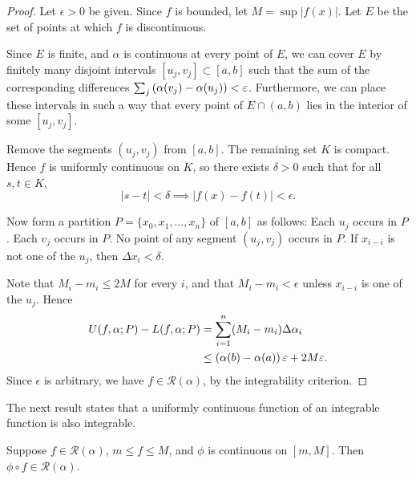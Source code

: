 \begin{proof}
Let $\epsilon>0$ be given. Since $f$ is bounded, let $M=\sup|f(x)|$. Let $E$ be the set of points at which $f$ is discontinuous.

Since $E$ is finite, and $\alpha$ is continuous at every point of $E$, we can cover $E$ by finitely many disjoint intervals $[u_j,v_j]\subset[a,b]$ such that the sum of the corresponding differences $\sum_{j}\left(\alpha(v_j)-\alpha(u_j)\right)<\varepsilon$. Furthermore, we can place these intervals in such a way that every point of $E\cap(a,b)$ lies in the interior of some $[u_j,v_j]$.

Remove the segments $(u_j,v_j)$ from $[a,b]$. The remaining set $K$ is compact. Hence $f$ is uniformly continuous on $K$, so there exists $\delta>0$ such that for all $s,t\in K$,
\[|s-t|<\delta\implies|f(x)-f(t)|<\epsilon.\]

Now form a partition $P=\{x_0,x_1,\dots,x_n\}$ of $[a,b]$ as follows: Each $u_j$ occurs in $P$. Each $v_j$ occurs in $P$. No point of any segment $(u_j,v_j)$ occurs in $P$. If $x_{i-i}$ is not one of the $u_j$, then $\Delta x_i<\delta$.

Note that $M_i-m_i\le 2M$ for every $i$, and that $M_i-m_i<\epsilon$ unless $x_{i-i}$ is one of the $u_j$. Hence
\begin{align*}
U(f,\alpha;P)-L(f,\alpha;P)
&=\sum_{i=1}^{n}(M_i-m_i)\Delta\alpha_i\\
&\le\left(\alpha(b)-\alpha(a)\right)\varepsilon+2M\varepsilon.
\end{align*}
Since $\epsilon$ is arbitrary, we have $f\in\mathcal{R}(\alpha)$, by the integrability criterion.
\end{proof}

The next result states that a uniformly continuous function of an integrable function is also integrable.

\begin{proposition}\label{prop:integral-composition}
Suppose $f\in \mathcal{R}(\alpha)$, $m\le f\le M$, and $\phi$ is continuous on $[m,M]$. Then $\phi\circ f\in \mathcal{R}(\alpha)$.
\end{proposition}

